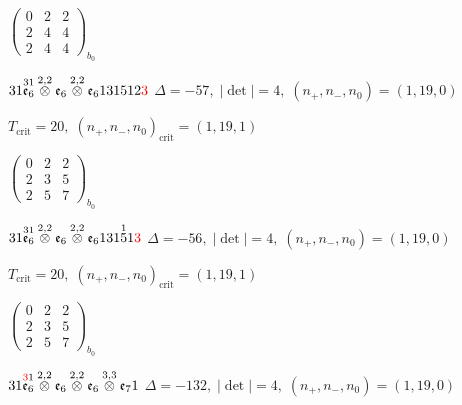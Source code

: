 \documentclass[10pt]{article}
\begin{document}
\hspace{2em}$\left(\begin{smallmatrix}0 & 2 & 2 \\ 2 & 4 & 4 \\ 2 & 4 & 4\end{smallmatrix}\right)_{\!b_0}$

\smallskip

$31\overset{31}{\mathfrak{e}_6}\overset{2,2}{\otimes}\mathfrak{e}_6\overset{2,2}{\otimes}\mathfrak{e}_6131512\textcolor{red}{3}$ \quad $\Delta=-57,\; |\det|=4,\; (n_+,n_-,n_0)=(1,19,0)$

\hspace{1em}$T_{\text{crit}}=20,\; (n_+,n_-,n_0)_{\text{crit}}=(1,19,1)$

\hspace{2em}$\left(\begin{smallmatrix}0 & 2 & 2 \\ 2 & 3 & 5 \\ 2 & 5 & 7\end{smallmatrix}\right)_{\!b_0}$

\smallskip

$31\overset{31}{\mathfrak{e}_6}\overset{2,2}{\otimes}\mathfrak{e}_6\overset{2,2}{\otimes}\mathfrak{e}_6131\overset{1}{5}1\textcolor{red}{3}$ \quad $\Delta=-56,\; |\det|=4,\; (n_+,n_-,n_0)=(1,19,0)$

\hspace{1em}$T_{\text{crit}}=20,\; (n_+,n_-,n_0)_{\text{crit}}=(1,19,1)$

\hspace{2em}$\left(\begin{smallmatrix}0 & 2 & 2 \\ 2 & 3 & 5 \\ 2 & 5 & 7\end{smallmatrix}\right)_{\!b_0}$

\smallskip

$31\overset{\textcolor{red}{3}1}{\mathfrak{e}_6}\overset{2,2}{\otimes}\mathfrak{e}_6\overset{2,2}{\otimes}\mathfrak{e}_6\overset{3,3}{\otimes}\mathfrak{e}_71$ \quad $\Delta=-132,\; |\det|=4,\; (n_+,n_-,n_0)=(1,19,0)$
\end{document}
